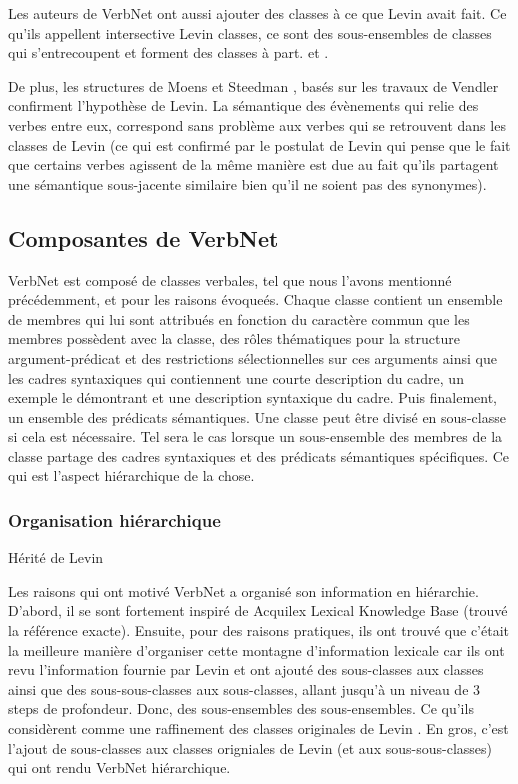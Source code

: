 Les auteurs de VerbNet ont aussi ajouter des classes à ce que Levin avait fait. Ce qu'ils appellent intersective Levin classes, ce sont des sous-ensembles de classes qui s'entrecoupent et forment des classes à part. \citep{SchulerVerbnetBroadcoverageComprehensive2005} et \citep{verbnet.2006}.

De plus, les structures de Moens et  Steedman \citep{MoensTemporalOntologyTemporal1988}, basés sur les travaux de Vendler confirment l'hypothèse de Levin. La sémantique des évènements qui relie des verbes entre eux, correspond sans problème aux verbes qui se retrouvent dans les classes de Levin (ce qui est confirmé par le postulat de Levin qui pense que le fait que certains verbes agissent de la même manière est due au fait qu'ils partagent une sémantique sous-jacente similaire bien qu'il ne soient pas des synonymes).

\subsection {Composantes de VerbNet}  

VerbNet est composé de classes verbales, tel que nous l'avons mentionné précédemment, et pour les raisons évoqueés. Chaque classe contient un ensemble de membres qui lui sont attribués en fonction du caractère commun que les membres possèdent avec la classe, des rôles thématiques pour la structure argument-prédicat et des restrictions sélectionnelles sur ces arguments ainsi que les cadres syntaxiques qui contiennent une courte description du cadre, un exemple le démontrant et une description syntaxique du cadre. Puis finalement, un ensemble des prédicats sémantiques. Une classe peut être divisé en sous-classe si cela est nécessaire. Tel sera le cas lorsque un sous-ensemble des membres de la classe partage des cadres syntaxiques et des prédicats sémantiques spécifiques. Ce qui est l'aspect hiérarchique de la chose.

\subsubsection{Organisation hiérarchique}

Hérité de Levin \citep{verb-classes.levin.1993}

Les raisons qui ont motivé VerbNet a organisé son information en hiérarchie. D'abord, il se sont fortement inspiré de Acquilex Lexical Knowledge Base (trouvé la référence exacte). Ensuite, pour des raisons pratiques, ils ont trouvé que c'était la meilleure manière d'organiser cette montagne d'information lexicale car ils ont revu l'information fournie par Levin et ont ajouté des sous-classes aux classes ainsi que des sous-sous-classes aux sous-classes, allant jusqu'à un niveau de 3 steps de profondeur. Donc, des sous-ensembles des sous-ensembles. Ce qu'ils considèrent comme une raffinement des classes originales de Levin \citep{SchulerVerbnetBroadcoverageComprehensive2005}. En gros, c'est l'ajout de sous-classes aux classes origniales de Levin (et aux sous-sous-classes) qui ont rendu VerbNet hiérarchique. 

